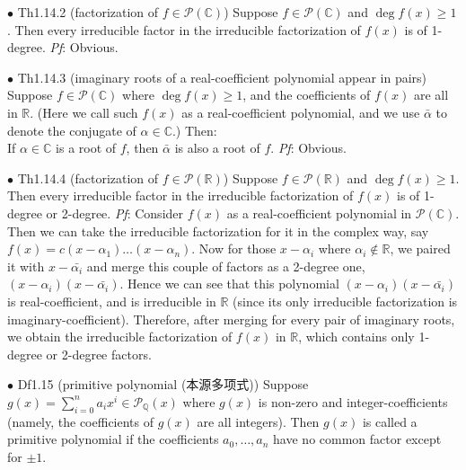 \documentclass{article}
\begin{document}
\begin{Th}{$\bullet$ Th1.14.2 (factorization of $f\in\mathcal{P}(\mathbb{C})$)}
    Suppose $f\in\mathcal{P}(\mathbb{C})$ and $\deg f(x)\geq 1$. Then every irreducible factor in the irreducible factorization of $f(x)$ is of 1-degree.
    \tcblower
    \textit{Pf}: Obvious.
\end{Th}

\begin{Th}{$\bullet$ Th1.14.3 (imaginary roots of a real-coefficient polynomial appear in pairs)}
    Suppose $f\in\mathcal{P}(\mathbb{C})$ where $\deg f(x)\geq 1$, and the coefficients of $f(x)$ are all in $\mathbb{R}$. \textcolor{Df}{(Here we call such $f(x)$ as a real-coefficient polynomial, and we use $\bar{\alpha}$ to denote the conjugate of $\alpha\in\mathbb{C}$.)} Then:\\
    If $\alpha\in\mathbb{C}$ is a root of $f$, then $\bar{\alpha}$ is also a root of $f$.
    \tcblower
    \textit{Pf}: Obvious.
\end{Th}

\begin{Th}{$\bullet$ Th1.14.4 (factorization of $f\in\mathcal{P}(\mathbb{R})$)}
    Suppose $f\in\mathcal{P}(\mathbb{R})$ and $\deg f(x)\geq 1$. Then every irreducible factor in the irreducible factorization of $f(x)$ is of 1-degree or 2-degree.
    \tcblower
    \textit{Pf}: Consider $f(x)$ as a real-coefficient polynomial in $\mathcal{P}(\mathbb{C})$. Then we can take the irreducible factorization for it in the complex way, say $f(x) = c(x-\alpha_1)\dots (x-\alpha_n)$. Now for those $x-\alpha_i$ where $\alpha_i\notin\mathbb{R}$, we paired it with $x-\bar{\alpha_i}$ and merge this couple of factors as a 2-degree one, $(x-\alpha_i)(x-\bar{\alpha_i})$. Hence we can see that this polynomial $(x-\alpha_i)(x-\bar{\alpha_i})$ is real-coefficient, and is irreducible in $\mathbb{R}$ (since its only irreducible factorization is imaginary-coefficient). Therefore, after merging for every pair of imaginary roots, we obtain the irreducible factorization of $f(x)$ in $\mathbb{R}$, which contains only 1-degree or 2-degree factors.
\end{Th}

\begin{Df}{$\bullet$ Df1.15 (primitive polynomial (本源多项式))}
    Suppose $g(x)=\sum_{i=0}^{n} a_ix^i\in\mathcal{P}_\mathbb{\mathbb{Q}}(x)$ where $g(x)$ is non-zero and integer-coefficients (namely, the coefficients of $g(x)$ are all integers). Then $g(x)$ is called a primitive polynomial if the coefficients $a_0, \dots, a_n$ have no common factor except for $\pm 1$.
\end{Df}
\end{document}
